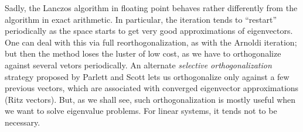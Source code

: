 \documentclass[12pt, leqno]{article} %
\begin{document}
Sadly, the Lanczos algorithm in floating point behaves rather differently
from the algorithm in exact arithmetic.  In particular, the iteration
tends to ``restart'' periodically as the space starts to get very good
approximations of eigenvectors.  One can deal with this via full
reorthogonalization, as with the Arnoldi iteration; but then the method
loses the luster of low cost, as we have to orthogonalize against several
vetors periodically.  An alternate {\em selective orthogonalization}
strategy proposed by Parlett and Scott lets us orthogonalize only against
a few previous vectors, which are associated with converged eigenvector
approximations (Ritz vectors).  But, as we shall see, such orthogonalization
is mostly useful when we want to solve eigenvalue problems.  For linear
systems, it tends not to be necessary.
\end{document}
